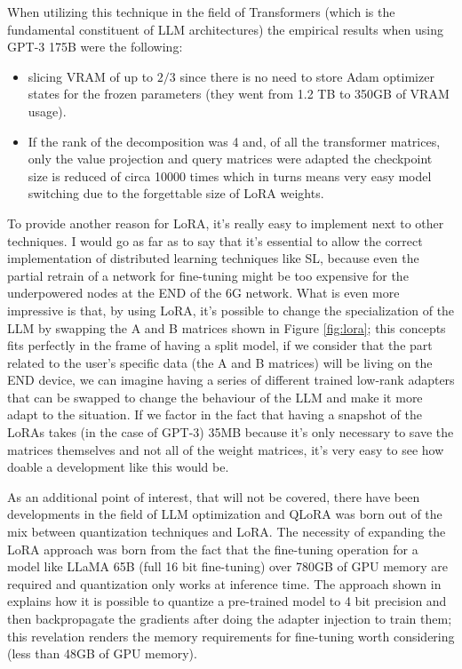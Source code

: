 When utilizing this technique in the field of Transformers (which is the fundamental constituent of
LLM architectures) the empirical results when using GPT-3 175B were the following:
\begin{itemize}
	\item slicing VRAM of up to $2/3$ since there is no need to store Adam optimizer states for
	      the frozen parameters (they went from 1.2 TB to 350GB of VRAM usage).
	\item If the rank of the decomposition was 4 and, of all the transformer matrices, only the
	      value projection and query matrices were adapted the checkpoint size is reduced of
	      circa 10000 times which in turns means very easy model switching due to the
	      forgettable size of LoRA weights.
\end{itemize}
To provide another reason for LoRA, it's really easy to implement next to other techniques. I would
go as far as to say that it's essential to allow the correct implementation of distributed
learning techniques like SL, because even the partial retrain of a network for fine-tuning might be
too expensive for the underpowered nodes at the END of the 6G network. What is even more impressive
is that, by using LoRA, it's possible to change the specialization of the LLM by swapping the A and
B matrices shown in Figure \ref{fig:lora}; this concepts fits perfectly in the frame of having a
split model, if we consider that the part related to the user's specific data (the A and B matrices)
will be living on the END device, we can imagine having a series of different trained low-rank
adapters that can be swapped to change the behaviour of the LLM and make it more adapt to the
situation. If we factor in the fact that having a snapshot of the LoRAs takes (in the case of GPT-3)
35MB because it's only necessary to save the matrices themselves and not all of the weight matrices,
it's very easy to see how doable a development like this would be.

As an additional point of interest, that will not be covered, there have been developments in the
field of LLM optimization and QLoRA was born out of the mix between quantization techniques and
LoRA. The necessity of expanding the LoRA approach was born from the fact that the fine-tuning
operation for a model like LLaMA 65B (full 16 bit fine-tuning) over 780GB of GPU memory are required
and quantization only works at inference time. The approach shown in \cite{qlora} explains how it is
possible to quantize a pre-trained model to 4 bit precision and then backpropagate the gradients
after doing the adapter injection to train them; this revelation renders the memory requirements for
fine-tuning worth considering (less than 48GB of GPU memory).
